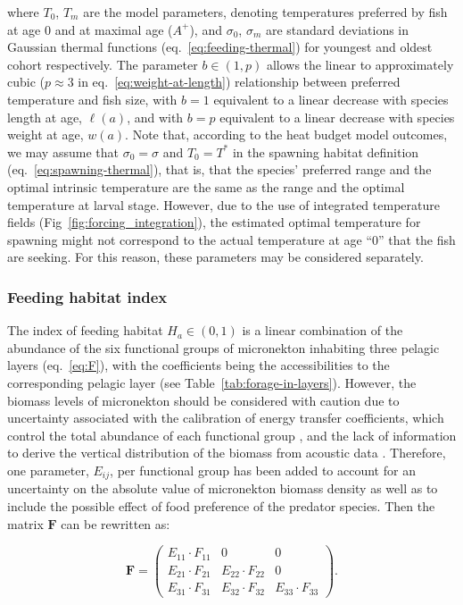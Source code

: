 \noindent where $T_0$, $T_m$ are the model parameters, denoting temperatures preferred by fish at age 0 and at maximal age ($A^{+}$), and $\sigma_0$, $\sigma_m$ are standard deviations in Gaussian thermal functions (eq.~\ref{eq:feeding-thermal}) for youngest and oldest cohort respectively. The parameter $b\in(1,p)$ allows the linear to approximately cubic ($p \approx 3$ in eq.~\ref{eq:weight-at-length}) relationship between preferred temperature and fish size, with $b=1$ equivalent to a linear decrease with species length at age, $\ell(a)$, and with $b=p$ equivalent to a linear decrease with species weight at age, $w(a)$. Note that, according to the heat budget model outcomes, we may assume that $\sigma_0=\sigma$ and $T_0=T^*$ in the spawning habitat definition (eq.~\ref{eq:spawning-thermal}), that is, that the species' preferred range and the optimal intrinsic temperature are the same as the range and the optimal temperature at larval stage. However, due to the use of integrated temperature fields (Fig~\ref{fig:forcing_integration}), the estimated optimal temperature for spawning might not correspond to the actual temperature at age ``0'' that the fish are seeking. For this reason, these parameters may be considered separately.


\subsubsection{Feeding habitat index}\label{sec:feeding-habitat}

The index of feeding habitat $H_a \in (0,1)$ is a linear combination of the abundance of the  six functional groups of micronekton inhabiting three pelagic layers (eq.~\ref{eq:F}), with the coefficients being the accessibilities to the corresponding pelagic layer (see Table~\ref{tab:forage-in-layers}). However, the biomass levels of micronekton should be considered with caution due to uncertainty associated with the calibration of energy transfer coefficients, which control the total abundance of each functional group \citep{Delpech}, and the lack of information to derive the vertical distribution of the biomass from acoustic data \citep{Lehodey2015}. Therefore, one parameter, $E_{ij}$, per functional group has been added to account for an uncertainty on the absolute value of micronekton biomass density as well as to include the possible effect of food preference of the predator species. Then the matrix $\mathbf{F}$ can be rewritten as:

\begin{equation}
 \mathbf{F} = \left( 
  \begin{array}{ccc}
	E_{11}\cdot F_{11} & 0 & 0 \\
	E_{21}\cdot F_{21} & E_{22}\cdot F_{22} & 0 \\
	E_{31}\cdot F_{31} & E_{32}\cdot F_{32} & E_{33}\cdot F_{33}
  \end{array} \right).
\label{eq:eF-matrix}
\end{equation}


